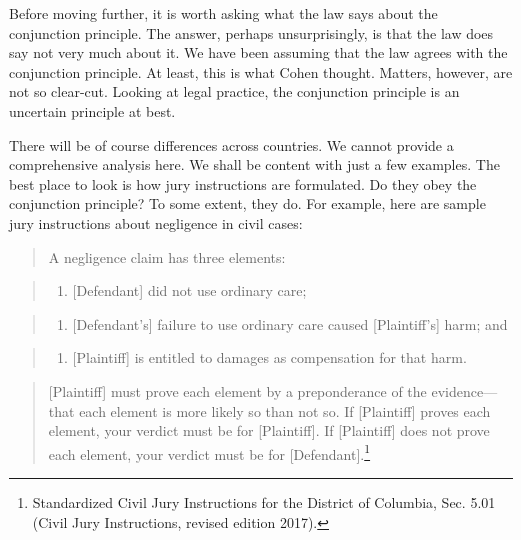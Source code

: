 \documentclass[
  10pt,
  dvipsnames,enabledeprecatedfontcommands]{scrartcl}
\providecommand{\tightlist}{%
  \setlength{\itemsep}{0pt}\setlength{\parskip}{0pt}}
\begin{document}
Before moving further, it is worth asking what the law says about the
conjunction principle. The answer, perhaps unsurprisingly, is that the
law does say not very much about it. We have been assuming that the law
agrees with the conjunction principle. At least, this is what Cohen
thought. Matters, however, are not so clear-cut. Looking at legal
practice, the conjunction principle is an uncertain principle at best.

There will be of course differences across countries. We cannot provide
a comprehensive analysis here. We shall be content with just a few
examples. The best place to look is how jury instructions are
formulated. Do they obey the conjunction principle? To some extent, they
do. For example, here are sample jury instructions about negligence in
civil cases:

\begin{quote}
A negligence claim has three elements:
\end{quote}

\begin{quote}
\begin{enumerate}
\def\labelenumi{\arabic{enumi}.}
\tightlist
\item
  {[}Defendant{]} did not use ordinary care;
\end{enumerate}
\end{quote}

\begin{quote}
\begin{enumerate}
\def\labelenumi{\arabic{enumi}.}
\setcounter{enumi}{1}
\tightlist
\item
  {[}Defendant's{]} failure to use ordinary care caused
  {[}Plaintiff's{]} harm; and
\end{enumerate}
\end{quote}

\begin{quote}
\begin{enumerate}
\def\labelenumi{\arabic{enumi}.}
\setcounter{enumi}{2}
\tightlist
\item
  {[}Plaintiff{]} is entitled to damages as compensation for that harm.
\end{enumerate}
\end{quote}

\begin{quote}
{[}Plaintiff{]} must prove each element by a preponderance of the
evidence---that each element is more likely so than not so. If
{[}Plaintiff{]} proves each element, your verdict must be for
{[}Plaintiff{]}. If {[}Plaintiff{]} does not prove each element, your
verdict must be for {[}Defendant{]}.\footnote{Standardized Civil Jury
  Instructions for the District of Columbia, Sec. 5.01 (Civil Jury
  Instructions, revised edition 2017).}
\end{quote}
\end{document}
